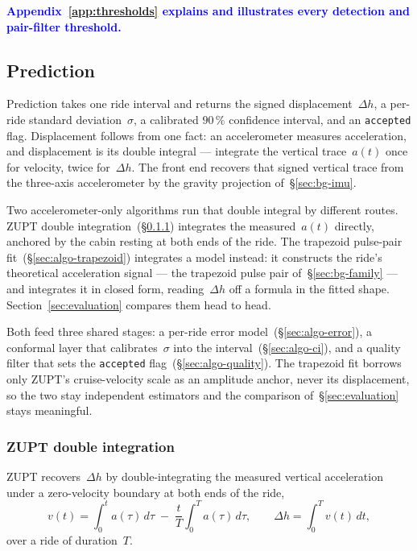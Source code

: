 \documentclass[manuscript,review,screen]{acmart}
\begin{document}
\begin{center}
\textcolor{blue}{\bfseries Appendix~\ref{app:thresholds} explains and
illustrates every detection and pair-filter threshold.}
\end{center}

\subsection{Prediction}
\label{sec:algo-pred}

Prediction takes one ride interval and returns the signed
displacement~$\Delta h$, a per-ride standard deviation~$\sigma$, a
calibrated $90\,\%$ confidence interval, and an \texttt{accepted}
flag.  Displacement follows from one fact: an accelerometer measures
acceleration, and displacement is its double integral --- integrate
the vertical trace~$a(t)$ once for velocity, twice for~$\Delta h$.
The front end recovers that signed vertical trace from the three-axis
accelerometer by the gravity projection of~\S\ref{sec:bg-imu}.

Two accelerometer-only algorithms run that double integral by
different routes.  ZUPT double integration~(\S\ref{sec:algo-zupt})
integrates the measured~$a(t)$ directly, anchored by the cabin
resting at both ends of the ride.  The trapezoid pulse-pair
fit~(\S\ref{sec:algo-trapezoid}) integrates a model instead: it
constructs the ride's theoretical acceleration signal --- the
trapezoid pulse pair of~\S\ref{sec:bg-family} --- and integrates it
in closed form, reading~$\Delta h$ off a formula in the fitted shape.
Section~\ref{sec:evaluation} compares them head to head.

Both feed three shared stages: a per-ride error
model~(\S\ref{sec:algo-error}), a conformal layer that
calibrates~$\sigma$ into the interval~(\S\ref{sec:algo-ci}), and a
quality filter that sets the \texttt{accepted}
flag~(\S\ref{sec:algo-quality}).  The trapezoid fit borrows only
ZUPT's cruise-velocity scale as an amplitude anchor, never its
displacement, so the two stay independent estimators and the
comparison of~\S\ref{sec:evaluation} stays meaningful.

\subsubsection{ZUPT double integration}
\label{sec:algo-zupt}

ZUPT recovers~$\Delta h$ by double-integrating the measured vertical
acceleration under a zero-velocity boundary at both ends of the ride,
\begin{equation}
  v(t)=\int_{0}^{t}\!a(\tau)\,d\tau
        \;-\;\frac{t}{T}\int_{0}^{T}\!a(\tau)\,d\tau,
  \qquad
  \Delta h=\int_{0}^{T}\!v(t)\,dt,
  \label{eq:zupt-integral}
\end{equation}
over a ride of duration~$T$.
\end{document}
